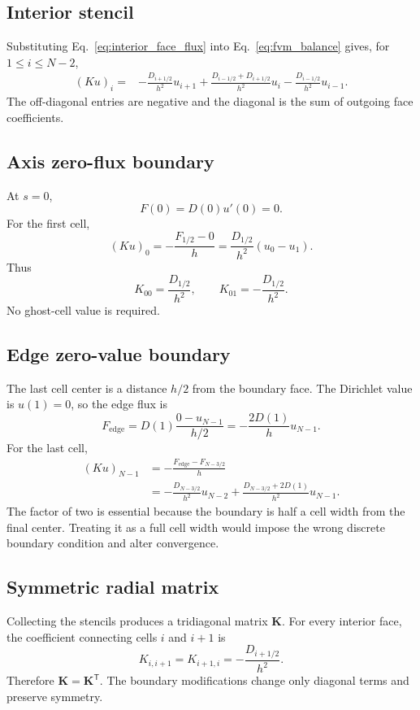 \subsection{Interior stencil}
Substituting Eq.~\eqref{eq:interior_face_flux} into Eq.~\eqref{eq:fvm_balance} gives, for $1\le i\le N-2$,
\begin{align}
(Ku)_i={}&
-\frac{D_{i+1/2}}{h^2}u_{i+1}
+\frac{D_{i-1/2}+D_{i+1/2}}{h^2}u_i
-\frac{D_{i-1/2}}{h^2}u_{i-1}.
\label{eq:interior_stencil}
\end{align}
The off-diagonal entries are negative and the diagonal is the sum of outgoing face coefficients.

\subsection{Axis zero-flux boundary}
At $s=0$,
\begin{equation}
F(0)=D(0)u'(0)=0.
\end{equation}
For the first cell,
\begin{equation}
(Ku)_0=-\frac{F_{1/2}-0}{h}
=\frac{D_{1/2}}{h^2}(u_0-u_1).
\label{eq:left_boundary_stencil}
\end{equation}
Thus
\begin{equation}
K_{00}=\frac{D_{1/2}}{h^2},
\qquad
K_{01}=-\frac{D_{1/2}}{h^2}.
\end{equation}
No ghost-cell value is required.

\subsection{Edge zero-value boundary}
The last cell center is a distance $h/2$ from the boundary face. The Dirichlet value is $u(1)=0$, so the edge flux is
\begin{equation}
F_{\mathrm{edge}}
=D(1)\frac{0-u_{N-1}}{h/2}
=-\frac{2D(1)}{h}u_{N-1}.
\label{eq:edge_face_flux}
\end{equation}
For the last cell,
\begin{align}
(Ku)_{N-1}
&=-\frac{F_{\mathrm{edge}}-F_{N-3/2}}{h}\\
&=-\frac{D_{N-3/2}}{h^2}u_{N-2}
+\frac{D_{N-3/2}+2D(1)}{h^2}u_{N-1}.
\label{eq:right_boundary_stencil}
\end{align}
The factor of two is essential because the boundary is half a cell width from the final center. Treating it as a full cell width would impose the wrong discrete boundary condition and alter convergence.

\subsection{Symmetric radial matrix}
Collecting the stencils produces a tridiagonal matrix $\mathbf K$. For every interior face, the coefficient connecting cells $i$ and $i+1$ is
\begin{equation}
K_{i,i+1}=K_{i+1,i}=-\frac{D_{i+1/2}}{h^2}.
\end{equation}
Therefore $\mathbf K=\mathbf K^{\mathsf T}$. The boundary modifications change only diagonal terms and preserve symmetry.


